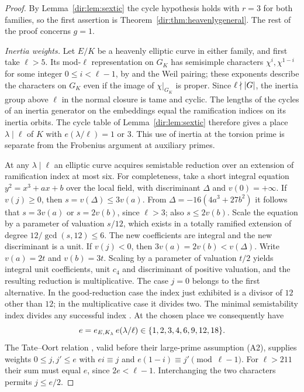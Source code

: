 \begin{proof}
By Lemma~\ref{dir:lem:sextic} the cycle hypothesis holds with $r=3$ for both families, so
the first assertion is Theorem~\ref{dir:thm:heavenlygeneral}. The rest of the proof concerns
$g=1$.

\emph{Inertia weights.} Let $E/K$ be a heavenly elliptic curve in either family, and
first take $\ell>5$. Its mod-$\ell$ representation on $G_K$ has semisimple characters
$\chi^i,\chi^{1-i}$ for some integer $0\le i<\ell-1$, by
\cite[Lemma~3.3]{RasmussenTamagawa2017Arithmetic} and the Weil pairing; these exponents
describe the characters on $G_K$ even if the image of $\chi|_{G_K}$ is proper. Since
$\ell\nmid\lvert G\rvert$, the inertia group above $\ell$ in the normal closure is tame and
cyclic. The lengths of the cycles of an inertia generator on the embeddings equal the
ramification indices on its inertia orbits. The cycle table of Lemma~\ref{dir:lem:sextic}
therefore gives a place $\lambda\mid\ell$ of $K$ with $e(\lambda/\ell)=1$ or $3$. This
use of inertia at the torsion prime is separate from the Frobenius argument at
auxiliary primes.

At any $\lambda\mid\ell$ an elliptic curve acquires semistable reduction over an
extension of ramification index at most six. For completeness, take a short integral
equation $y^2=x^3+ax+b$ over the local field, with discriminant $\Delta$ and
$v(0)=+\infty$. If $v(j)\ge0$, then $s=v(\Delta)\le3v(a)$. From
$\Delta=-16(4a^3+27b^2)$ it follows that $s=3v(a)$ or $s=2v(b)$, since $\ell>3$; also
$s\le2v(b)$. Scale the equation by a parameter of valuation $s/12$, which exists in a
totally ramified extension of degree $12/\gcd(s,12)\le6$. The new coefficients are
integral and the new discriminant is a unit. If $v(j)<0$, then
$3v(a)=2v(b)<v(\Delta)$. Write $v(a)=2t$ and $v(b)=3t$. Scaling by a parameter of
valuation $t/2$ yields integral unit coefficients, unit $c_4$ and discriminant of
positive valuation, and the resulting reduction is multiplicative. The case $j=0$
belongs to the first alternative. In the good-reduction case the index just exhibited
is a divisor of $12$ other than $12$; in the multiplicative case it divides two. The
minimal semistability index divides any successful index
\cite[\S3.1]{RasmussenTamagawa2017Arithmetic}. At the chosen place we consequently
have
\[
 e=e_{E,K_\lambda}\,e(\lambda/\ell)\in\{1,2,3,4,6,9,12,18\}.
\]
The Tate--Oort relation \cite[(3.1)]{RasmussenTamagawa2017Arithmetic}, valid before
their large-prime assumption (A2), supplies weights $0\le j,j'\le e$ with
$ei\equiv j$ and $e(1-i)\equiv j'\pmod{\ell-1}$. For $\ell>211$ their sum must equal
$e$, since $2e<\ell-1$. Interchanging the two characters permits $j\le e/2$.


\end{proof}
